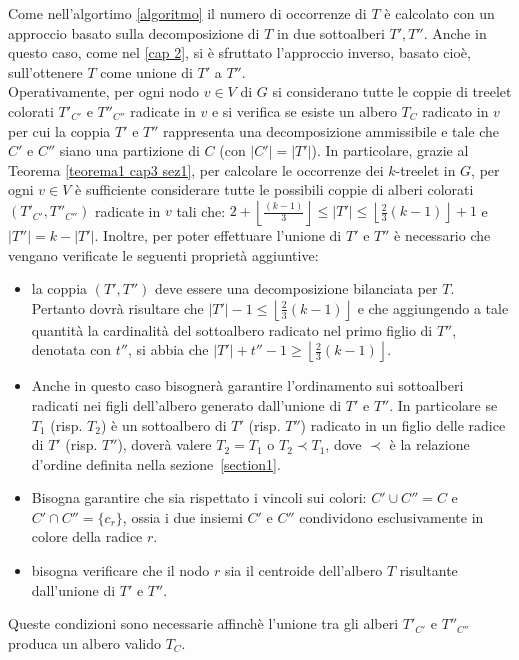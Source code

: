 Come nell'algortimo \ref{algoritmo} il numero di occorrenze di $ T $ è calcolato con un approccio basato sulla decomposizione di $T$ in due sottoalberi $T', T''$. Anche in questo caso, come nel \ref{cap 2}, si è sfruttato l'approccio inverso, basato cioè, sull'ottenere $T$ come unione di $T'$ a $T''$.\\
Operativamente, per ogni nodo $ v\in V $ di $ G $ si considerano tutte le coppie di treelet colorati $ T'_{C'} $ e $ T''_{C''} $ radicate in $ v $ e si verifica se esiste un albero $ T_C $ radicato in $ v $ per cui la coppia $ T' $ e $ T'' $ rappresenta una decomposizione ammissibile e tale che $ C' $ e $ C'' $ siano una partizione di $ C $ (con $|C'|=|T'|$). 
In particolare, grazie al Teorema \ref{teorema1 cap3 sez1}, per calcolare le occorrenze dei $ k $-treelet in $ G $, per ogni $v \in V $  è sufficiente considerare tutte le possibili coppie di alberi colorati $ (T'_{C'}, T''_{C''} )$ radicate in $ v $ tali che: $ 2+ \left\lfloor \frac{(k-1)}{3}  \right\rfloor \le |T'| \le \left\lfloor \frac{2}{3}(k-1) \right\rfloor  +1 $ e $ |T''| = k-|T'| $.
Inoltre, per poter effettuare l'unione di  $T'$ e $T''$ è necessario che vengano verificate le seguenti proprietà aggiuntive: 
\begin{itemize}
	\label{prova}
	\item la coppia $ (T',T'') $ deve essere una decomposizione bilanciata per $ T $.
	Pertanto dovr\`a risultare che $ |T'| - 1 \le \left\lfloor\frac{2}{3}(k-1)\right\rfloor $ e che aggiungendo a tale quantit\`a la cardinalit\`a del sottoalbero radicato nel primo figlio di $ T'' $, denotata con $ t'' $, si abbia che $ |T'| + t'' - 1 \ge \left\lfloor\frac{2}{3}(k-1)\right\rfloor $.
	\item Anche in questo caso bisogner\`a garantire l'ordinamento sui sottoalberi radicati nei figli dell'albero generato dall'unione di $ T' $ e $ T'' $.
	In particolare se $T_1$ (risp. $T_2$) è un sottoalbero di $T'$ (risp. $T''$) radicato in un figlio delle radice di $T'$ (risp. $T''$), doverà valere $T_2 = T_1$ o $T_2 \prec T_1$, dove $\prec$ è la relazione d'ordine definita nella sezione~\ref{section1}.  
	\item Bisogna garantire che sia rispettato i vincoli sui colori: $C' \cup C'' = C$ e $ C' \cap C'' = \{c_r\}$, ossia i due insiemi $C'$ e $C''$ condividono esclusivamente in colore della radice $ r $.
	\item bisogna verificare che il nodo $ r $ sia il centroide dell'albero $ T $ risultante dall'unione di $ T' $ e $ T'' $. 
\end{itemize}
Queste condizioni sono necessarie affinch\`e l'unione tra gli alberi $ T'_{C'} $ e $ T''_{C''} $ produca un albero valido $ T_C $.

